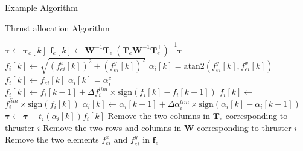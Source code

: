 \documentclass[11pt]{article}
\begin{document}
Example Algorithm
\begin{algorithm}[ht]
    \caption{Thrust allocation Algorithm}\label{alg:thralloc}
    \begin{algorithmic}[1]
        \Statex
        \Repeat
            \State $\boldsymbol{\tau} \gets \boldsymbol{\tau}_c[k]$
            \State $\mathbf f_e[k] \gets \mathbf W^{-1} \mathbf T_e^\top (\mathbf T_e \mathbf W^{-1} \mathbf T_e^\top)^{-1} \boldsymbol \tau$
             \label{alg:unextending}
            \State $f_i[k] \gets \sqrt{(f_{ei}^x[k])^2 + (f_{ei}^y[k])^2}$ \label{alg:pseudoinv}
            \State $ \alpha_i[k] = \mathrm{atan2}(f_{ei}^y[k], f_{ei}^x[k])$
            \Else
            \State $f_i[k] \gets f_{ei}[k]$
            \State $ \alpha_i[k] = \alpha^c_i$
            \EndIf
            \EndFor
             \label{alg:limiting}
            \State $f_i[k] \gets f_i[k-1] + \Delta f_i^{lim} \times \mathrm{sign}(f_i[k] - f_i[k-1])$
            \EndIf
            \State $f_i[k] \gets$ $f_i^{lim} \times \mathrm{sign}(f_i[k])$
            \EndIf
            \State $\alpha_i[k] \gets \alpha_i[k-1] + \Delta \alpha_i^{lim} \times \mathrm{sign}(\alpha_i[k] - \alpha_i[k-1])$
            \EndIf
            \EndFor
             \label{alg:nextIterPrep}
            \State $\boldsymbol{\tau} \gets \boldsymbol{\tau} - t_i(\alpha_i[k])f_i[k]$
            \State Remove the two columns in $\mathbf T_e$ corresponding to thruster $i$
            \State Remove the two rows and columns in $\mathbf W$ corresponding to thruster $i$
            \State Remove the two elements $f_{ei}^x$ and $f_{ei}^y$ in $\mathbf f_e$

\end{algorithmic}
\end{algorithm}
\end{document}

